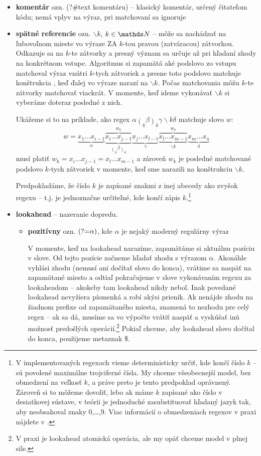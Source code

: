 \begin{itemize}
\item \textbf{komentár} ozn. (?\#text komentáru) -- klasický komentár, určený čitateľom kódu; nemá vplyv na výraz, pri matchovaní sa ignoruje
\item \textbf{spätné referencie} ozn. $\backslash k$, $k \in\N$ -- môže sa nachádzať na ľubovoľnom mieste vo výraze ZA $k$-tou pravou (zatváracou) zátvorkou. Odkazuje sa na $k$-te zátvorky a presný význam sa určuje až pri hľadaní zhody na konkrétnom vstupe. Algoritmus si zapamätá aké podslovo zo vstupu matchoval výraz vnútri $k$-tych zátvoriek a presne toto podslovo matchuje konštrukcia , keď ďalej vo výraze narazí na $\backslash k$. Počas matchovania môžu $k$-te zátvorky matchovať viackrát. V momente, keď ideme vykonávať $\backslash k$ si vyberáme doteraz posledné z nich.

Ukážeme si to na príklade, ako regex $\displaystyle \alpha\mathop{(}_k\beta\mathop{)}_k\gamma\backslash k\delta$ matchuje slovo $w$:
$$w = \underbrace{x_1\dots x_{i-1}}_\alpha 
 \overbrace{\underbrace{x_i\dots x_{j-1}}_{ \displaystyle{\mathop(_k\beta \mathop)_k}}}^{w_k} 
 \underbrace{x_j\dots x_{l-1}}_\gamma 
 \overbrace{\underbrace{x_l\dots x_{m-1}}_{\backslash k}}^{w_k}
 \underbrace{x_{m}\dots x_{n}}_\delta$$
musí platiť $w_k= x_i\dots x_{j-1} = x_l\dots x_{m-1} $ a zároveň $w_k$ je posledné matchované podslovo $k$-tych zátvoriek v momente, keď sme narazili na konštrukciu $\backslash k$.


Predpokladáme, že číslo $k$ je zapísané znakmi z inej abecedy ako zvyšok regexu -- t.j. je jednoznačne určiteľné, kde končí zápis $k$.\footnote{V implementovaných regexoch vieme deterministicky určiť, kde končí číslo $k$ -- sú povolené maximálne trojciferné čísla. My chceme všeobecnejší model, bez obmedzení na veľkosť $k$, a práve preto je tento predpoklad oprávnený. Zároveň si to môžeme dovoliť, lebo ak máme $k$ zapísané ako číslo v desiatkovej sústave, v teórii je jednoduché zasubstituovať hľadaný jazyk tak, aby neobsahoval znaky 0,\dots,9. Viac informácií o obmedzeniach regexov v praxi nájdete v \cite[kapitola Prax]{mojaBak}.}

\item \textbf{lookahead} -- nazeranie dopredu.
\begin{itemize}
\item \textbf{pozitívny} ozn. $\text{(?=}\alpha)$, kde $\alpha$ je nejaký moderný regulárny výraz 

V momente, keď na lookahead narazíme, zapamätáme si aktuálnu pozíciu v slove. Od tejto pozície začneme hľadať zhodu s výrazom $\alpha$. Akonáhle vyhlási zhodu (nemusí ani dočítať slovo do konca), vrátime sa naspäť na zapamätané miesto a odtiaľ pokračujeme v slove vykonávaním regexu za lookaheadom -- akokeby tam lookahead nikdy nebol. Inak povedané lookahead nevyžiera písmenká a robí akýsi prienik. Ak nenájde zhodu na žiadnom prefixe od zapamätaného miesta, znamená to nezhodu pre celý regex -- ak sa dá, musíme sa vo výpočte vrátiť naspäť a vyskúšať inú možnosť predošlých operácií.\footnote{V praxi je lookahead atomická operácia, ale my opäť chceme model v plnej sile.} Pokiaľ chceme, aby lookahead slovo dočítal do konca, použijeme metaznak \$.


\end{itemize}
\end{itemize}
